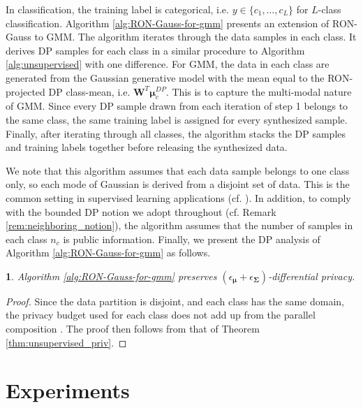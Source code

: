 \documentclass[USenglish,oneside,twocolumn]{article}
\theoremstyle{definition}
\theoremstyle{remark}
\theoremstyle{plain}
\newtheorem{thm}{\protect\theoremname}
\theoremstyle{plain}
\providecommand{\theoremname}{Theorem}
\begin{document}
In classification, the training label is categorical, i.e. $y\in\{c_{1},\ldots,c_{L}\}$
for $L$-class classification. Algorithm \ref{alg:RON-Gauss-for-gmm}
presents an extension of RON-Gauss to GMM. The algorithm iterates
through the data samples in each class. It derives DP samples for each class in
a similar procedure to Algorithm {\small{}\ref{alg:unsupervised} }with
one difference. For GMM, the data in each class are generated from
the Gaussian generative model with the mean equal to the RON-projected
DP class-mean, i.e. $\mathbf{W}^{T}\boldsymbol{\mu}_{c}^{DP}$. This
is to capture the multi-modal nature of GMM. Since every DP sample
drawn from each iteration of step 1 belongs to the same class, the
same training label is assigned for every synthesized sample. Finally, after iterating
through all classes, the algorithm stacks the DP samples and training
labels together before releasing the synthesized data.

We note that this algorithm assumes that each data sample belongs to
one class only, so each mode of Gaussian is derived from a disjoint
set of data. This is the common setting in supervised learning applications (cf. \cite{RefWorks:51,RefWorks:33,RefWorks:225,RefWorks:376}).
In addition, to comply with the bounded DP notion we adopt throughout
(cf. Remark \ref{rem:neighboring_notion}), the algorithm assumes
that the number of samples in each class $n_{c}$ is public information.
Finally, we present the DP analysis of Algorithm \ref{alg:RON-Gauss-for-gmm}
as follows.
\begin{thm}
Algorithm \ref{alg:RON-Gauss-for-gmm} preserves $(\epsilon_{\boldsymbol{\mu}}+\epsilon_{\boldsymbol{\Sigma}})$-differential
privacy. 
\end{thm}
\begin{proof}
Since the data partition is disjoint, and each class has the same domain, the privacy
budget used for each class does not add up from the parallel composition \cite{RefWorks:477,mcsherry2009privacy}. The proof then follows from
that of Theorem \ref{thm:unsupervised_priv}.
\end{proof}



\vspace{-1.5em}
\section{Experiments\label{sec:Experiments}}
\end{document}
